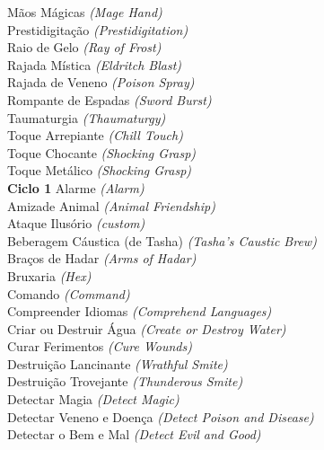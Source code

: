\documentclass{RPG_Adventure}[2021/10/20]
\begin{document}
{\normalsize Mãos Mágicas \textit{(Mage Hand)}\\ }
{\normalsize Prestidigitação \textit{(Prestidigitation)}\\ }
{\normalsize Raio de Gelo \textit{(Ray of Frost)}\\ }
{\normalsize Rajada Mística \textit{(Eldritch Blast)}\\ }
{\normalsize Rajada de Veneno \textit{(Poison Spray)}\\ }
{\normalsize Rompante de Espadas \textit{(Sword Burst)}\\ }
{\normalsize Taumaturgia \textit{(Thaumaturgy)}\\ }
{\normalsize Toque Arrepiante \textit{(Chill Touch)}\\ }
{\normalsize Toque Chocante \textit{(Shocking Grasp)}\\ }
{\normalsize Toque Metálico \textit{(Shocking Grasp)}\\ }
\jump\noindent\textbf{Ciclo 1}
{\normalsize Alarme \textit{(Alarm)}\\ }
{\normalsize Amizade Animal \textit{(Animal Friendship)}\\ }
{\normalsize Ataque Ilusório \textit{(custom)}\\ }
{\normalsize Beberagem Cáustica (de Tasha) \textit{(Tasha's Caustic Brew)}\\ }
{\normalsize Braços de Hadar \textit{(Arms of Hadar)}\\ }
{\normalsize Bruxaria \textit{(Hex)}\\ }
{\normalsize Comando \textit{(Command)}\\ }
{\normalsize Compreender Idiomas \textit{(Comprehend Languages)}\\ }
{\normalsize Criar ou Destruir Água \textit{(Create or Destroy Water)}\\ }
{\normalsize Curar Ferimentos \textit{(Cure Wounds)}\\ }
{\normalsize Destruição Lancinante \textit{(Wrathful Smite)}\\ }
{\normalsize Destruição Trovejante \textit{(Thunderous Smite)}\\ }
{\normalsize Detectar Magia \textit{(Detect Magic)}\\ }
{\normalsize Detectar Veneno e Doença \textit{(Detect Poison and Disease)}\\ }
{\normalsize Detectar o Bem e Mal \textit{(Detect Evil and Good)}\\ }
\end{document}
